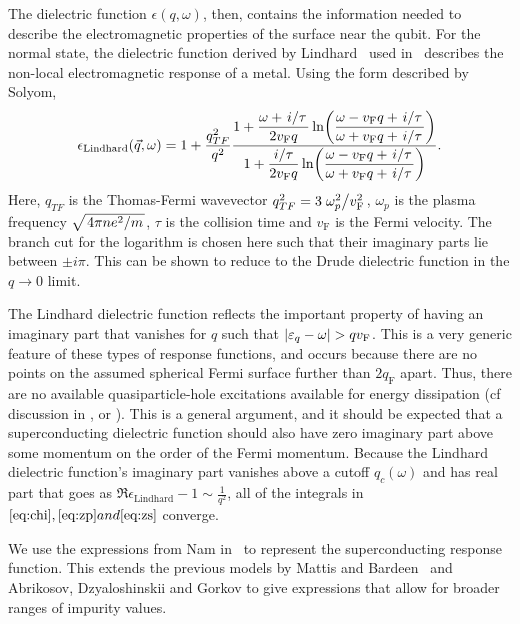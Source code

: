 \documentclass{article}
\newcommand{\vf}{v_{\mathrm{F}}}
\begin{document}
The dielectric function $\epsilon(q, \omega)$, then, contains the information needed to describe the electromagnetic properties of the surface near the qubit.
For the normal state, the dielectric function derived by Lindhard~\cite{Lindhard} used in~\cite{QubitRelax} describes the non-local electromagnetic response of a metal.
Using the form described by Solyom\cite{SolyomV3},
\begin{equation}
	\epsilon_{\mathrm{Lindhard}}(\vec{q}, \omega) = 1 + \frac{q_{TF}^2}{q^2}\frac{\displaystyle 1 + \frac{\omega + \flatfrac{i}{\tau}}{2 \vf q} \ln(\frac{\omega - \vf q + \flatfrac{i}{\tau}}{\omega + \vf q + \flatfrac{i}{\tau}})}{\displaystyle 1 + \frac{\flatfrac{i}{\tau}}{2 \vf q} \ln(\frac{\omega - \vf q + \flatfrac{i}{\tau}}{\omega + \vf q + \flatfrac{i}{\tau}})}. \label{eq:lindhardsolyom}
\end{equation}
Here, $q_{TF}$ is the Thomas-Fermi wavevector $q_{TF}^2 = 3 \flatfrac{\omega_p^2}{\vf^2}$, $\omega_p$ is the plasma frequency $\sqrt{\flatfrac{4 \pi n e^2}{m}}$, $\tau$ is the collision time and $\vf$ is the Fermi velocity.
The branch cut for the logarithm is chosen here such that their imaginary parts lie between $\pm i \pi$.
This can be shown to reduce to the Drude dielectric function in the $q \rightarrow 0$ limit.

The Lindhard dielectric function reflects the important property of having an imaginary part that vanishes for $q$ such that $\abs{\varepsilon_q - \omega} >  q\vf$.
This is a very generic feature of these types of response functions, and occurs because there are no points on the assumed spherical Fermi surface further than $2 q_{\mathrm{F}}$ apart.
Thus, there are no available quasiparticle-hole excitations available for energy dissipation (cf discussion in \cite{AGD}, \cite{FetterWalecka} or \cite{SolyomV3}).
This is a general argument, and it should be expected that a superconducting dielectric function should also have zero imaginary part above some momentum on the order of the Fermi momentum.
Because the Lindhard dielectric function's imaginary part vanishes above a cutoff $q_c\left(\omega\right)$ and has real part that goes as $\Re \epsilon_{\mathrm{Lindhard}} - 1 \sim \frac{1}{q^2}$, all of the integrals in $\eqref{eq:chi}, \eqref{eq:zp} and \eqref{eq:zs}$ converge.

We use the expressions from Nam in~\cite{Nam1967} to represent the superconducting response function.
This extends the previous models by Mattis and Bardeen~\cite{Mattis} and Abrikosov, Dzyaloshinskii and Gorkov\cite{AGD} to give expressions that allow for broader ranges of impurity values.
\end{document}
